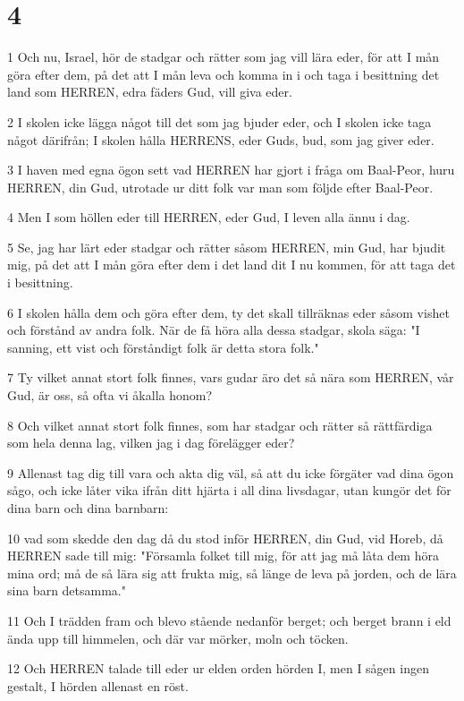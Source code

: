 \chapter{4}

\par 1 Och nu, Israel, hör de stadgar och rätter som jag vill lära eder, för att I mån göra efter dem, på det att I mån leva och komma in i och taga i besittning det land som HERREN, edra fäders Gud, vill giva eder.
\par 2 I skolen icke lägga något till det som jag bjuder eder, och I skolen icke taga något därifrån; I skolen hålla HERRENS, eder Guds, bud, som jag giver eder.
\par 3 I haven med egna ögon sett vad HERREN har gjort i fråga om Baal-Peor, huru HERREN, din Gud, utrotade ur ditt folk var man som följde efter Baal-Peor.
\par 4 Men I som höllen eder till HERREN, eder Gud, I leven alla ännu i dag.
\par 5 Se, jag har lärt eder stadgar och rätter såsom HERREN, min Gud, har bjudit mig, på det att I mån göra efter dem i det land dit I nu kommen, för att taga det i besittning.
\par 6 I skolen hålla dem och göra efter dem, ty det skall tillräknas eder såsom vishet och förstånd av andra folk. När de få höra alla dessa stadgar, skola säga: "I sanning, ett vist och förståndigt folk är detta stora folk."
\par 7 Ty vilket annat stort folk finnes, vars gudar äro det så nära som HERREN, vår Gud, är oss, så ofta vi åkalla honom?
\par 8 Och vilket annat stort folk finnes, som har stadgar och rätter så rättfärdiga som hela denna lag, vilken jag i dag förelägger eder?
\par 9 Allenast tag dig till vara och akta dig väl, så att du icke förgäter vad dina ögon sågo, och icke låter vika ifrån ditt hjärta i all dina livsdagar, utan kungör det för dina barn och dina barnbarn:
\par 10 vad som skedde den dag då du stod inför HERREN, din Gud, vid Horeb, då HERREN sade till mig: "Församla folket till mig, för att jag må låta dem höra mina ord; må de så lära sig att frukta mig, så länge de leva på jorden, och de lära sina barn detsamma."
\par 11 Och I trädden fram och blevo stående nedanför berget; och berget brann i eld ända upp till himmelen, och där var mörker, moln och töcken.
\par 12 Och HERREN talade till eder ur elden orden hörden I, men I sågen ingen gestalt, I hörden allenast en röst.
